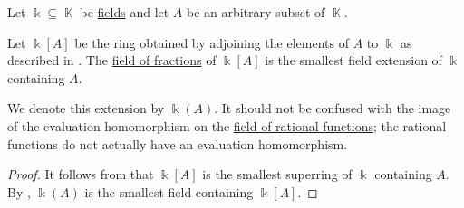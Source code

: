 \begin{proposition}\label{thm:adjoining_elements_to_field}
  Let \( \Bbbk \subseteq \BbbK \) be \hyperref[def:field]{fields} and let \( A \) be an arbitrary subset of \( \BbbK \).

  Let \( \Bbbk[A] \) be the ring obtained by adjoining the elements of \( A \) to \( \Bbbk \) as described in . The \hyperref[thm:field_of_fractions]{field of fractions} of \( \Bbbk[A] \) is the smallest field extension of \( \Bbbk \) containing \( A \).

  We denote this extension by \( \Bbbk(A) \). It should not be confused with the image of the evaluation homomorphism on the \hyperref[def:rational_function_field]{field of rational functions}; the rational functions do not actually have an evaluation homomorphism.
\end{proposition}
\begin{proof}
  It follows from  that \( \Bbbk[A] \) is the smallest superring of \( \Bbbk \) containing \( A \). By , \( \Bbbk(A) \) is the smallest field containing \( \Bbbk[A] \).
\end{proof}
